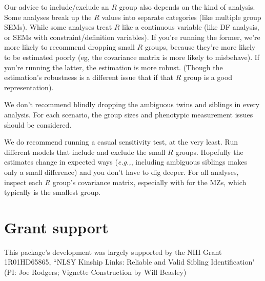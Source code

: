 \documentclass[letter]{article}\usepackage{graphicx, color}
\begin{document}
Our advice to include/exclude an $R$ group also depends on the kind of analysis.  Some analyses break up the $R$ values into separate categories (like multiple group SEMs).  While some analyses treat $R$ like a continuous variable (like DF analysis, or SEMs with constraint/definition variables).  If you're running the former, we're more likely to recommend dropping small $R$ groups, because they're more likely to be estimated poorly (eg, the covariance matrix is more likely to misbehave).  If you're running the latter, the estimation is more robust.  (Though the estimation's robustness is a different issue that if that $R$ group is a good representation).

We don't recommend blindly dropping the ambiguous twins and siblings in every analysis.  For each scenario, the group sizes and phenotypic measurement issues should be considered.

We do recommend running a casual sensitivity test, at the very least.  Run different models that include and exclude the small $R$ groups.  Hopefully the estimates change in expected ways (\emph{e.g.,}, including ambiguous siblings makes only a small difference)  and you don't have to dig deeper.  For all analyses, inspect each $R$ group's covariance matrix, especially with for the MZs, which typically is the smallest group. 


\section{Grant support}
This package's development was largely supported by the NIH Grant 1R01HD65865, ``NLSY Kinship Links: Reliable and Valid Sibling Identification" (PI: Joe Rodgers; Vignette Construction by Will Beasley)
\end{document}
